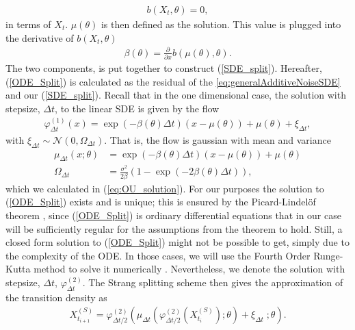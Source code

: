 \begin{align}
     b(X_t, \theta) = 0,
\end{align}
in terms of $X_t$. $\mu\left(\theta\right)$ is then defined as the solution. This value is plugged into the derivative of $b(X_t, \theta)$ 
\begin{align}
    \beta\left(\theta\right) = \frac{\partial}{\partial x} b(\mu\left(\theta\right), \theta).
\end{align}
The two components, is put together to construct (\ref{SDE_split}).
Hereafter, (\ref{ODE_Split}) is calculated as the residual of the \ref{eq:generalAdditiveNoiseSDE} and our (\ref{SDE_split}). Recall that in the one dimensional case, the solution with stepsize, $\Delta t$, to the linear SDE is given by the flow
\begin{align}
    \varphi_{\Delta t}^{(1)}(x) = \exp\left(-\beta\left(\theta\right) \Delta t\right)\left(x - \mu\left(\theta\right)\right) + \mu\left(\theta\right) + \xi_{\Delta t}, \label{varphiTheoretical}
\end{align}
with $\xi_{\Delta t}\sim\mathcal{N}\left(0, \Omega_{\Delta t}\right)$. That is, the flow is gaussian with mean and variance
\begin{align}
    \mu_{\Delta t}(x; \theta) &= \exp\left(-\beta\left(\theta\right) \Delta t\right)\left(x - \mu\left(\theta\right)\right) + \mu\left(\theta\right) \label{linearSDEMean}\\
    \Omega_{\Delta t} &= \frac{\sigma^2}{2\beta}\left(1 - \exp\left(-2\beta\left(\theta\right)\Delta t\right)\right), \label{linearSDEVariance}
\end{align}
which we calculated in (\ref{eq:OU_solution}). For our purposes the solution to (\ref{ODE_Split}) exists and is unique; this is ensured by the Picard-Lindelöf theorem \cite[section 2.7]{Srkk2019}, since (\ref{ODE_Split}) is ordinary differential equations that in our case will be sufficiently regular for the assumptions from the theorem to hold. Still, a closed form solution to (\ref{ODE_Split}) might not be possible to get, simply due to the complexity of the ODE. In those cases, we will use the Fourth Order Runge-Kutta method to solve it numerically \cite[p.541 equation (8)]{numericalAnalysis}.  
Nevertheless, we denote the solution with stepsize, $\Delta t$, $\varphi_{\Delta t}^{(2)}$. The Strang splitting scheme then gives the approximation of the transition density as 
\begin{align}
    X_{t_{i+1}}^{(S)} = \varphi_{\Delta t / 2}^{(2)}\left(\mu_{\Delta t}\left(\varphi_{\Delta t/2}^{(2)}\left(X_{t_{i}}^{(S)}\right); \theta\right) + \xi_{\Delta t} \; ; \theta \right). \label{eq:classicStrangSplitting}
\end{align}
